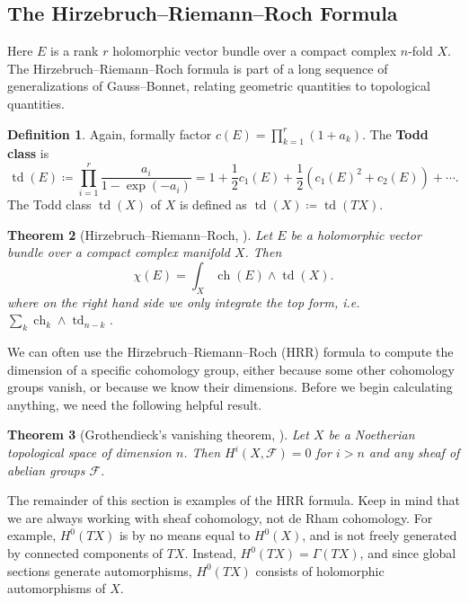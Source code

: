 \documentclass{report}
\theoremstyle{plain}
\newtheorem{theorem}{Theorem}[section]
\theoremstyle{definition}
\newtheorem{definition}[theorem]{Definition}
\theoremstyle{remark}
\newcommand{\cF}{\mathcal{F}}
\DeclareMathOperator{\ch}{ch}
\DeclareMathOperator{\td}{td}
\begin{document}
\subsection{The Hirzebruch--Riemann--Roch Formula}

Here $E$ is a rank $r$ holomorphic vector bundle over a compact
complex $n$-fold $X$. The Hirzebruch--Riemann--Roch formula is part of
a long sequence of generalizations of Gauss--Bonnet, relating
geometric quantities to topological quantities.

\begin{definition}
  Again, formally factor $c(E) = \prod_{k=1}^r (1 + a_k)$. The {\bf
    Todd class} is
  \[ \td(E) \coloneqq \prod_{i=1}^r \frac{a_i}{1 - \exp(-a_i)} = 1 + \frac{1}{2}c_1(E) + \frac{1}{2}(c_1(E)^2 + c_2(E)) + \cdots. \]
  The Todd class $\td(X)$ of $X$ is defined as $\td(X) \coloneqq
  \td(TX)$.
\end{definition}

\begin{theorem}[Hirzebruch--Riemann--Roch, {\cite[Theorem A.4.1]{Hartshorne1997}}] \label{thm:hirzebruch-riemann-roch}
  Let $E$ be a holomorphic vector bundle over a compact complex
  manifold $X$. Then
  \[ \chi(E) = \int_X \ch(E) \wedge \td(X). \]
  where on the right hand side we only integrate the top form, i.e.
  $\sum_k \ch_k \wedge \td_{n-k}$.
\end{theorem}

We can often use the Hirzebruch--Riemann--Roch (HRR) formula to
compute the dimension of a specific cohomology group, either because
some other cohomology groups vanish, or because we know their
dimensions. Before we begin calculating anything, we need the
following helpful result.

\begin{theorem}[Grothendieck's vanishing theorem, {\cite[Theorem 2.7]{Hartshorne1997}}] \label{thm:grothendieck-vanishing-criterion}
  Let $X$ be a Noetherian topological space of dimension $n$. Then
  $H^i(X, \cF) = 0$ for $i > n$ and any sheaf of abelian groups $\cF$.
\end{theorem}

The remainder of this section is examples of the HRR formula. Keep in
mind that we are always working with sheaf cohomology, not de Rham
cohomology. For example, $H^0(TX)$ is by no means equal to $H^0(X)$,
and is not freely generated by connected components of $TX$. Instead,
$H^0(TX) = \Gamma(TX)$, and since global sections generate
automorphisms, $H^0(TX)$ consists of holomorphic automorphisms of $X$.
\end{document}
